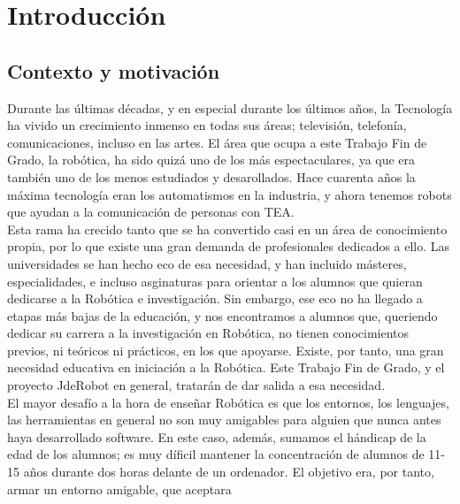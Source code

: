 \chapter{Introducción}
\label{cap:introduccion}

\section{Contexto y motivación}
Durante las últimas décadas, y en especial durante los últimos años, la Tecnología ha vivido un crecimiento inmenso en todas sus áreas; televisión, telefonía, comunicaciones, incluso en las artes. El área que ocupa a este Trabajo Fin de Grado, la robótica, ha sido quizá uno de los más espectaculares, ya que era también uno de los menos estudiados y desarollados. Hace cuarenta años la máxima tecnología eran los automatismos en la industria, y ahora tenemos robots que ayudan a la comunicación de personas con TEA.\\
Esta rama ha crecido tanto que se ha convertido casi en un área de conocimiento propia, por lo que existe una gran demanda de profesionales dedicados a ello. Las universidades se han hecho eco de esa necesidad, y han incluido másteres, especialidades, e incluso asginaturas para orientar a los alumnos que quieran dedicarse a la Robótica e investigación. Sin embargo, ese eco no ha llegado a etapas más bajas de la educación, y nos encontramos a alumnos que, queriendo dedicar su carrera a la investigación en Robótica, no tienen conocimientos previos, ni teóricos ni prácticos, en los que apoyarse. Existe, por tanto, una gran necesidad educativa en iniciación a la Robótica. Este Trabajo Fin de Grado, y el proyecto JdeRobot en general, tratarán de dar salida a esa necesidad. \\
El mayor desafío a la hora de enseñar Robótica es que los entornos, los lenguajes, las herramientas en general no son muy amigables para alguien que nunca antes haya desarrollado software. En este caso, además, sumamos el hándicap de la edad de los alumnos; es muy díficil mantener la concentración de alumnos de 11-15 años durante dos horas delante de un ordenador. El objetivo era, por tanto, armar un entorno amigable, que aceptara 